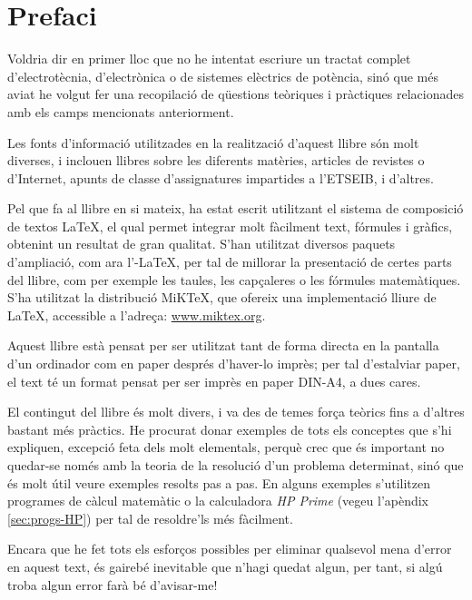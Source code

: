 \chapter*{Prefaci} 

   Voldria dir en primer lloc que no he intentat escriure un tractat complet
   d'electrotècnia, d'electrònica o de sistemes elèctrics de potència, sinó que més aviat
   he volgut
   fer una recopilació de qüestions teòriques i pràctiques relacionades amb els camps mencionats
   anteriorment.

   Les fonts d'informació utilitzades en la realització d'aquest llibre són molt diverses,
   i inclouen llibres sobre les diferents matèries, articles de revistes o d'Internet,
   apunts de classe d'assignatures impartides a l'ETSEIB, i d'altres.

   Pel que fa al llibre en si mateix, ha estat escrit utilitzant el sistema de composició de
   textos \LaTeX, el qual
   permet integrar molt fàcilment text, fórmules i gràfics, obtenint un resultat de
   gran qualitat. S'han utilitzat diversos paquets d'ampliació, com ara
   l'\AmS-\LaTeX,
   per tal de millorar la presentació de certes parts del
   llibre, com per exemple les taules, les capçaleres o les fórmules matemàtiques. S'ha utilitzat la distribució MiK\TeX, que ofereix una implementació lliure de \LaTeX , accessible a l'adreça: \href{http://www.miktex.org/}{www.miktex.org}.

   Aquest llibre està pensat per  ser utilitzat tant de forma directa en la pantalla d'un
   ordinador com en paper després d'haver-lo imprès; per tal d'estalviar paper, el text
   té un format pensat per  ser imprès en paper DIN-A4, a dues cares.

    El contingut del llibre és molt divers, i va des de temes força teòrics fins a
    d'altres bastant més pràctics. He procurat donar exemples de tots els conceptes
    que s'hi expliquen, excepció feta dels molt elementals, perquè crec que és important
     no quedar-se només amb la teoria de  la resolució d'un problema determinat, sinó que
     és molt útil veure exemples resolts pas a pas. En alguns exemples s'utilitzen programes de càlcul matemàtic o la calculadora \emph{HP Prime} (vegeu l'apèndix \ref{sec:progs-HP}) per tal de resoldre'ls més fàcilment.

    Encara que he fet tots els esforços possibles per eliminar qualsevol
    mena  d'error en aquest text, és gairebé inevitable que n'hagi quedat algun,
    per tant, si algú troba algun error farà bé d'avisar-me!


